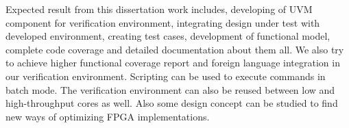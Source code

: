 \thispagestyle{plain}

Expected result from this dissertation work includes, developing of UVM component for verification environment, integrating design under test with developed environment, creating test cases, development of functional model, complete code coverage and detailed documentation about them all. We also try to achieve higher functional coverage report and foreign language integration in our verification environment. Scripting can be used to execute commands in batch mode. The verification environment can also be reused between low and high-throughput cores as well. Also some design concept can be studied to find new ways of optimizing FPGA implementations.